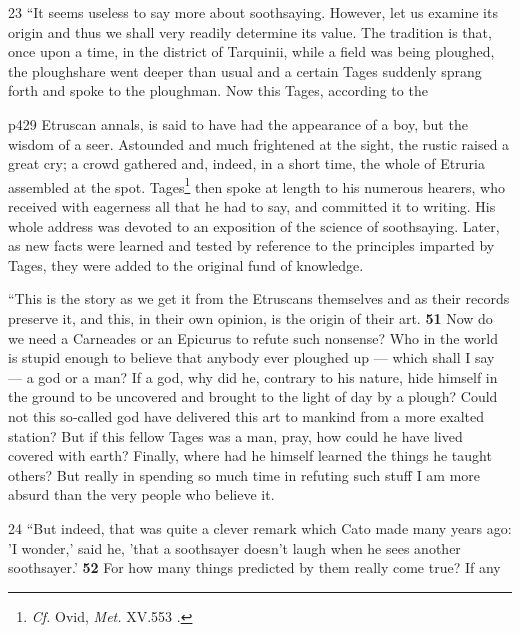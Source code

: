 23
``It seems useless to say more about soothsaying. However, let us examine its origin and thus we shall very readily determine its value. The tradition is that, once upon a time, in the district of Tarquinii, while a field was being ploughed, the ploughshare went deeper than usual and a certain Tages suddenly sprang forth and spoke to the ploughman. Now this Tages, according to the

p429 Etruscan annals, is said to have had the appearance of a boy, but the wisdom of a seer. Astounded and much frightened at the sight, the rustic raised a great cry; a crowd gathered and, indeed, in a short time, the whole of Etruria assembled at the spot. Tages\texthebrew{}\footnote{\emph{Cf.} Ovid, \emph{Met.} XV.553 .

} then spoke at length to his numerous hearers, who received with eagerness all that he had to say, and committed it to writing. His whole address was devoted to an exposition of the science of soothsaying. Later, as new facts were learned and tested by reference to the principles imparted by Tages, they were added to the original fund of knowledge.

``This is the story as we get it from the Etruscans themselves and as their records preserve it, and this, in their own opinion, is the origin of their art. \textbf{51} Now do we need a Carneades or an Epicurus to refute such nonsense? Who in the world is stupid enough to believe that anybody ever ploughed up \texthebrew{—} which shall I say \texthebrew{—} a god or a man? If a god, why did he, contrary to his nature, hide himself in the ground to be uncovered and brought to the light of day by a plough? Could not this so\texthebrew{‑}called god have delivered this art to mankind from a more exalted station? But if this fellow Tages was a man, pray, how could he have lived covered with earth? Finally, where had he himself learned the things he taught others? But really in spending so much time in refuting such stuff I am more absurd than the very people who believe it.

24
``But indeed, that was quite a clever remark which Cato made many years ago: 'I wonder,' said he, 'that a soothsayer doesn't laugh when he sees another soothsayer.' \textbf{52} For how many things predicted by them really come true? If any

